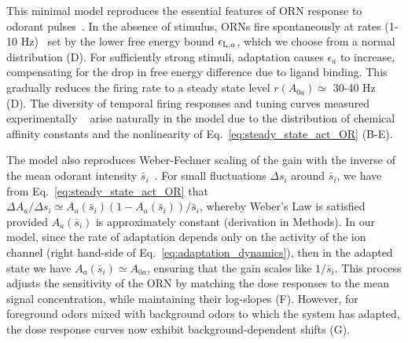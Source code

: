 \documentclass[9pt,lineno]{elife}
\begin{document}
This minimal model reproduces the essential features of ORN response to odorant pulses~\citep{nagel_wilson_biophysical, martelli, cao_WL}. In the absence of stimulus, ORNs fire spontaneously at rates (1-10 Hz)~\citep{hallem_carlson} set by the lower free energy bound $\epsilon_{\textup{L}, a}$, which we choose from a normal distribution (D). For sufficiently strong stimuli, adaptation causes $\epsilon_a$ to increase, compensating for the drop in free energy difference due to ligand binding. This gradually reduces the firing rate to a steady state level $r(A_{0a}) \simeq$ 30-40 Hz~\citep{srinivas_elife}  (D). The diversity of temporal firing responses and tuning curves measured experimentally ~\citep{hallem_carlson,montague2011similar, stopfer_nat_neuro, stopfer_temporal_channel,stopfer_temporal_model} arise naturally in the model due to the distribution of chemical affinity constants and the nonlinearity of Eq.~\ref{eq:steady_state_act_OR} (B-E). 

The model also reproduces Weber-Fechner scaling of the gain with the inverse of the mean odorant intensity $\bar{s}_i$~\citep{srinivas_elife, cao_WL}. For small fluctuations $\Delta s_i$ around $\bar{s}_i$, we have from Eq.~\ref{eq:steady_state_act_OR} that $\Delta A_a/\Delta s_i\simeq A_a\left(\bar{s}_i\right)\left(1-A_a\left(\bar{s}_i\right)\right)/\bar{s}_i$, whereby Weber's Law is satisfied provided $A_a(\bar{s}_i)$ is approximately constant (derivation in Methods). In our model, since the rate of adaptation depends only on the activity of the ion channel (right hand-side of Eq.~\ref{eq:adaptation_dynamics}), then in the adapted state we have $A_a\left(\bar{s}_i\right)\simeq A_{0a}$, ensuring that the gain scales like $1/\bar{s}_i$. This process adjusts the sensitivity of the ORN by matching the dose responses to the mean signal concentration, while maintaining their log-slopes (F). However, for foreground odors mixed with background odors to which the system has adapted, the dose response curves now exhibit background-dependent shifts (G). %

\end{document}
